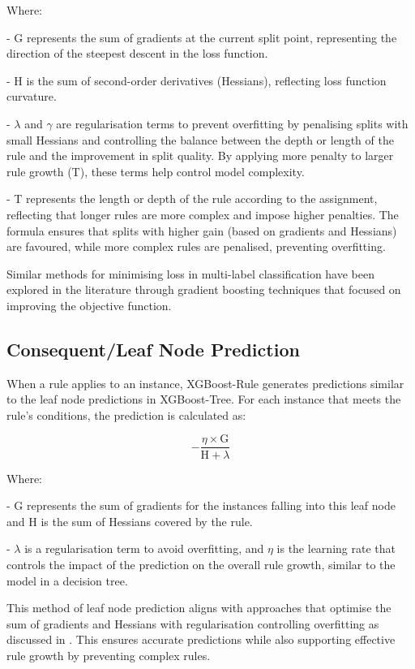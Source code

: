 \documentclass{article}
\begin{document}
Where:


- G represents the sum of gradients at the current split point, representing the direction of the steepest descent in the loss function. 

- H is the sum of second-order derivatives (Hessians), reflecting loss function curvature. 

- $\lambda$ and $\gamma$ are regularisation terms to prevent overfitting by penalising splits with small Hessians and controlling the balance between the depth or length of the rule and the improvement in split quality. By applying more penalty to larger rule growth (T), these terms help control model complexity.

- T represents the length or depth of the rule according to the assignment, reflecting that longer rules are more complex and impose higher penalties. 
The formula ensures that splits with higher gain (based on gradients and Hessians) are favoured, while more complex rules are penalised, preventing overfitting. 


Similar methods for minimising loss in multi-label classification have been explored in the literature \cite{rapp2021learning} through gradient boosting techniques that focused on improving the objective function.
\subsection{Consequent/Leaf Node Prediction}
When a rule applies to an instance, XGBoost-Rule generates predictions similar to the leaf node predictions in XGBoost-Tree. For each instance that meets the rule’s conditions, the prediction is calculated as:

\[
-\frac{\eta \times \text{G}}{\text{H} + \lambda}
\]

Where:

- G represents the sum of gradients for the instances falling into this leaf node and H is the sum of Hessians covered by the rule.

- $\lambda$ is a regularisation term to avoid overfitting, and $\eta$ is the learning rate that controls the impact of the prediction on the overall rule growth, similar to the model in a decision tree.

This method of leaf node prediction aligns with approaches that optimise the sum of gradients and Hessians with regularisation controlling overfitting as discussed in \cite{rapp2021learning}. This ensures accurate predictions while also supporting effective rule growth by preventing complex rules.
\end{document}
